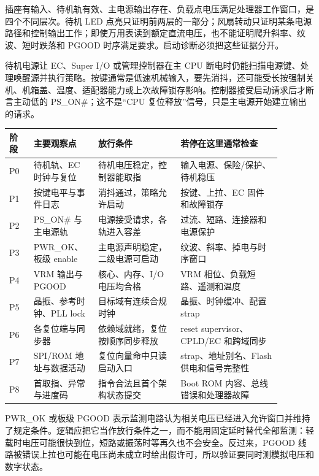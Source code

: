 
插座有输入、待机轨有效、主电源输出存在、负载点电压满足处理器工作窗口，是四个不同层次。待机 LED 点亮只证明前两层的一部分；风扇转动只证明某条电源路径和控制输出工作；即使万用表读到额定直流电压，也不能证明爬升斜率、纹波、短时跌落和 PGOOD 时序满足要求。启动诊断必须把这些证据分开。

待机电源让 EC、Super I/O 或管理控制器在主 CPU 断电时仍能扫描电源键、处理唤醒源并执行策略。按键通常是低速机械输入，要先消抖，还可能受长按强制关机、机箱盖、温度、适配器能力或上次故障锁存影响。控制器接受启动请求后才断言主动低的 PS\_ON\#；这不是“CPU 复位释放”信号，只是主电源开始建立输出的请求。

\Needspace{0.40\textheight}
\begin{longtable}{L{0.08\linewidth}L{0.2\linewidth}L{0.27\linewidth}L{0.33\linewidth}}
\toprule
阶段 & 主要观察点 & 放行条件 & 若停在这里通常检查 \\
\midrule
P0 & 待机轨、EC 时钟与复位 & 待机电压稳定，控制器能取指 & 输入电源、保险/保护、待机稳压 \\\tablerowrule
P1 & 按键电平与事件日志 & 消抖通过，策略允许启动 & 按键、上拉、EC 固件和故障锁存 \\\tablerowrule
P2 & PS\_ON\# 与主电源轨 & 电源接受请求，各轨进入容差 & 过流、短路、连接器和电源保护 \\\tablerowrule
P3 & PWR\_OK、板级 enable & 主电源声明稳定，二级电源可启动 & 纹波、斜率、掉电与时序窗口 \\\tablerowrule
P4 & VRM 输出与 PGOOD & 核心、内存、I/O 电压均合格 & VRM 相位、负载短路、遥测和温度 \\\tablerowrule
P5 & 晶振、参考时钟、PLL lock & 目标域有连续合规时钟 & 晶振、时钟缓冲、配置 strap \\\tablerowrule
P6 & 各复位端与同步器 & 依赖域就绪，复位按顺序同步释放 & reset supervisor、CPLD/EC 和跨域同步 \\\tablerowrule
P7 & SPI/ROM 地址与数据活动 & 复位向量命中只读启动入口 & strap、地址别名、Flash 供电和信号完整性 \\\tablerowrule
P8 & 首取指、异常与进度码 & 指令合法且首个架构状态提交 & Boot ROM 内容、总线错误和处理器故障 \\
\bottomrule
\end{longtable}


PWR\_OK 或板级 PGOOD 表示监测电路认为相关电压已经进入允许窗口并维持了规定条件。逻辑应把它当作放行条件之一，而不能用固定延时替代全部监测：轻载时电压可能很快到位，短路或振荡时等再久也不会安全。反过来，PGOOD 线路被错误上拉也可能在电压尚未成立时给出假许可，所以验证要同时测模拟电压和数字状态。

